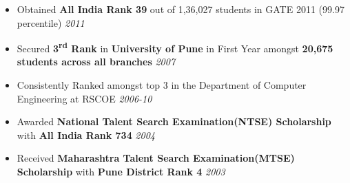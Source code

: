 \begin{itemize}
	\item Obtained \textbf{All India Rank 39} out of 1,36,027 students in GATE 2011 {(99.97 percentile)} \hfill \emph{2011} \\[-0.6cm]
	\item Secured \textbf{3\textsuperscript{rd} Rank} in \textbf{University of Pune} in First Year amongst \textbf{20,675 students across all branches} \hfill \emph{2007} \\[-0.6cm]
	\item Consistently Ranked amongst top 3 in the Department of Computer Engineering at RSCOE \hfill \emph{2006-10}  \\[-0.6cm]
	\item Awarded \textbf{National Talent Search Examination(NTSE) Scholarship} with \textbf{All India Rank 734} \hfill \emph{2004} \\[-0.6cm]
	\item Received \textbf{Maharashtra Talent Search Examination(MTSE) Scholarship} with \textbf{Pune District Rank 4} \hfill \emph{2003}
\end{itemize}